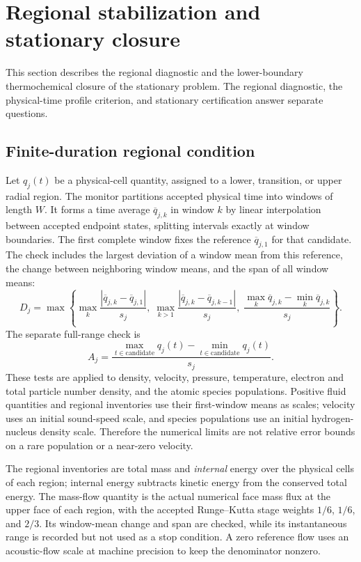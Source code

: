 \section{Regional stabilization and stationary closure}
\label{sec:v110-physics}

This section describes the regional diagnostic and the lower-boundary
thermochemical closure of the stationary problem. The regional diagnostic, the
physical-time profile criterion, and stationary certification answer separate
questions.

\subsection{Finite-duration regional condition}

Let $q_j(t)$ be a physical-cell quantity, assigned to a lower, transition,
or upper radial region. The monitor partitions accepted physical time into
windows of length $W$. It forms a time average $\overline q_{j,k}$ in window
$k$ by linear interpolation between accepted endpoint states, splitting
intervals exactly at window boundaries. The first complete window fixes the
reference $\overline q_{j,1}$ for that candidate. The check includes the
largest deviation of a window mean from this reference, the change between
neighboring window means, and the span of all window means:
\[
 D_j = \max\!\left\{
 \max_k\frac{|\overline q_{j,k}-\overline q_{j,1}|}{s_j},\;
 \max_{k>1}\frac{|\overline q_{j,k}-\overline q_{j,k-1}|}{s_j},\;
 \frac{\max_k\overline q_{j,k}-\min_k\overline q_{j,k}}{s_j}
 \right\}.
\]
The separate full-range check is
\[
 A_j=\frac{\max_{t\in\mathrm{candidate}}q_j(t)
             -\min_{t\in\mathrm{candidate}}q_j(t)}{s_j}.
\]
These tests are applied to density, velocity, pressure, temperature, electron
and total particle number density, and the atomic species populations. Positive
fluid quantities and regional inventories use their first-window means as
scales; velocity uses an initial sound-speed scale, and species populations
use an initial hydrogen-nucleus density scale. Therefore the numerical limits
are not relative error bounds on a rare population or a near-zero velocity.

The regional inventories are total mass and \emph{internal} energy over the
physical cells of each region; internal energy subtracts kinetic energy from
the conserved total energy. The mass-flow quantity is the actual numerical
face mass flux at the upper face of each region, with the accepted Runge--Kutta
stage weights $1/6$, $1/6$, and $2/3$. Its window-mean change and span are
checked, while its instantaneous range is recorded but not used as a stop
condition. A zero reference flow uses an acoustic-flow scale at machine
precision to keep the denominator nonzero.

